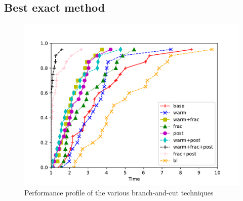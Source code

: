 \documentclass{article}
\begin{document}
\clearpage
\newpage

\subsection{Best exact method}


\begin{figure}[ht]
        \caption{Performance profile of the various branch-and-cut techniques}
        \label{fig:ht_bec}
        \centering
        \includegraphics[width=340pt]{assets/ht_bec.pdf}
\end{figure}

\clearpage
\newpage



\end{document}

